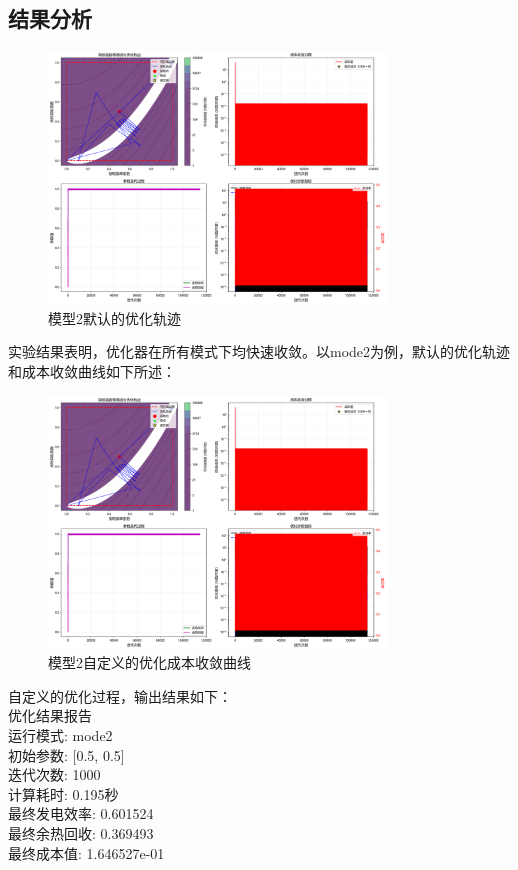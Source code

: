 \documentclass[a4paper,12pt]{article}
\begin{document}
\subsection{结果分析}
\begin{figure}
    \centering
    \includegraphics[width=0.8\textwidth]{fig/cchp_optimization_mode2-0.png}
    \caption{模型2默认的优化轨迹}
    \label{fig:trajectory}
\end{figure}

实验结果表明，优化器在所有模式下均快速收敛。以mode2为例，默认的优化轨迹和成本收敛曲线如下所述：


\begin{figure}
    \centering
    \includegraphics[width=0.8\textwidth]{fig/cchp_optimization_mode2-1.png}
    \caption{模型2自定义的优化成本收敛曲线}
    \label{fig:cost}
\end{figure}

自定义的优化过程，输出结果如下：\\
优化结果报告\\
运行模式:       mode2\\
初始参数:       [0.5, 0.5]\\
迭代次数:       1000\\
计算耗时:       0.195秒\\
最终发电效率:   0.601524\\
最终余热回收:   0.369493\\
最终成本值:     1.646527e-01\\
\end{document}
